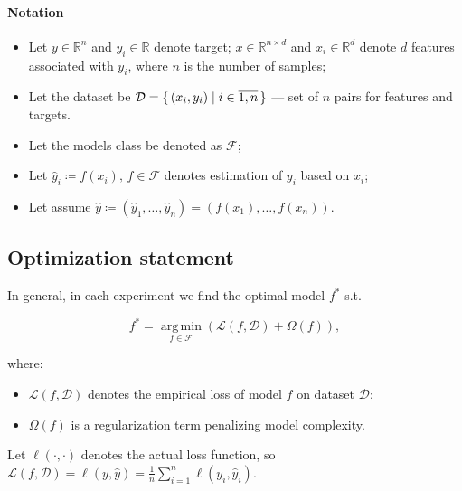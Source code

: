 \documentclass{article}
\DeclareMathOperator*{\argmin}{arg\,min}
\newcommand{\Reals}{\mathbb{R}}
\newcommand{\Ell}{\mathcal{L}}
\newcommand{\Dataset}{\mathcal{D}}
\newcommand{\Models}{\mathcal{F}}
\newcommand{\BestModel}{f^*}
\begin{document}
\paragraph{Notation}
\begin{itemize}
    \item Let \(y \in \Reals^n\) and \( y_i \in \Reals \) denote target; \(x \in \Reals^{n \times d}\) and \( x_i \in \Reals^d \) denote \(d\) features associated with \( y_i \), where \(n\) is the number of samples;
    \item Let the dataset be \( \Dataset = \set{(x_i, y_i) \mid i \in \overline{1, n}} \) --- set of \(n\) pairs for features and targets.
    \item Let the models class be denoted as \(\Models\);
    \item Let \( \hat{y}_i \coloneqq f(x_i),\, f \in \Models\) denotes estimation of \( y_i \) based on \( x_i \);
    \item Let assume \(\hat{y} \coloneqq \left( \hat{y}_1, \dots, \hat{y}_n \right) = \left( f(x_1), \dots, f(x_n) \right)\).
\end{itemize}


\subsection{Optimization statement}

In general, in each experiment we find the optimal model \(\BestModel\) s.t.

\begin{equation}
    \BestModel
    =
    \argmin\limits_{f \in \Models}{\left( \Ell(f, \Dataset) + \Omega(f) \right)},
    \label{oprimization:general-task}
\end{equation}

where:

\begin{itemize}
    \item \( \Ell(f, \Dataset) \) denotes the empirical loss of model \(f\) on dataset \(\Dataset\);
    \item \( \Omega(f) \) is a regularization term penalizing model complexity.
\end{itemize}

Let \(\ell(\cdot, \cdot)\) denotes the actual loss function, so \(\Ell(f, \Dataset) = \ell(y, \hat{y}) = \frac{1}{n}{\sum\limits_{i=1}^{n}{\ell(y_i, \hat{y}_i)}} \).
\end{document}
